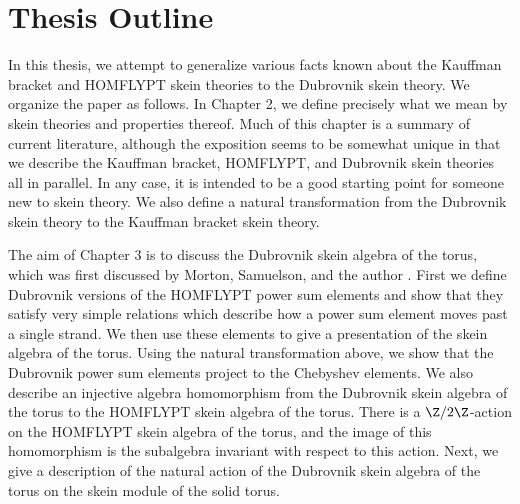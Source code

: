 \section{Thesis Outline}

In this thesis, we attempt to generalize various facts known about the Kauffman bracket and HOMFLYPT skein theories to the Dubrovnik skein theory. We organize the paper as follows. In Chapter 2, we define precisely what we mean by skein theories and properties thereof. Much of this chapter is a summary of current literature, although the exposition seems to be somewhat unique in that we describe the Kauffman bracket, HOMFLYPT, and Dubrovnik skein theories all in parallel. In any case, it is intended to be a good starting point for someone new to skein theory. We also define a natural transformation from the Dubrovnik skein theory to the Kauffman bracket skein theory. 

The aim of Chapter 3 is to discuss the Dubrovnik skein algebra of the torus, which was first discussed by Morton, Samuelson, and the author \cite{MPS19}. First we define Dubrovnik versions of the HOMFLYPT power sum elements and show that they satisfy very simple relations which describe how a power sum element moves past a single strand. We then use these elements to give a presentation of the skein algebra of the torus. Using the natural transformation above, we show that the Dubrovnik power sum elements project to the Chebyshev elements. We also describe an injective algebra homomorphism from the Dubrovnik skein algebra of the torus to the HOMFLYPT skein algebra of the torus. There is a $\Z/2\Z$-action on the HOMFLYPT skein algebra of the torus, and the image of this homomorphism is the subalgebra invariant with respect to this action. Next, we give a description of the natural action of the Dubrovnik skein algebra of the torus on the skein module of the solid torus. 

